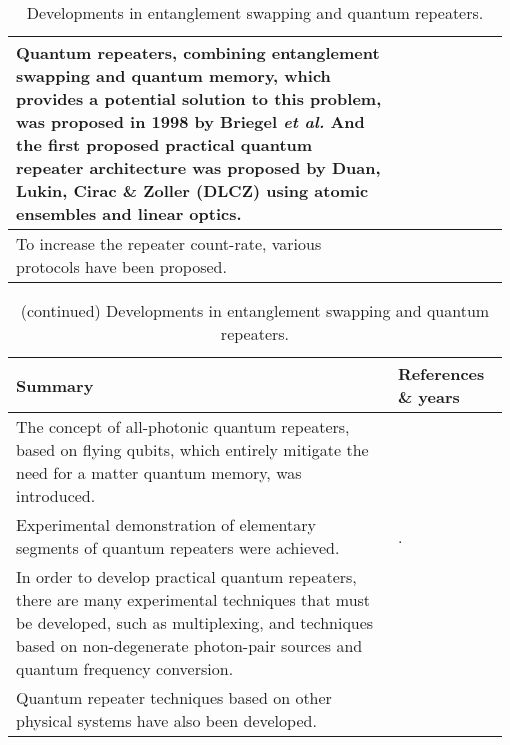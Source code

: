\begin{table*}[!htbp]
\begin{tabular}{|p{0.755\linewidth}|p{0.22\linewidth}|}
		Quantum repeaters, combining entanglement swapping and quantum memory, which provides a potential solution to this problem, was proposed in 1998 by Briegel \textit{et al.} And the first proposed practical quantum repeater architecture was proposed by Duan, Lukin, Cirac \& Zoller (DLCZ) using atomic ensembles and linear optics.&\cite{bib:BDCZ98, bib:Duan01}\\\hline
		To increase the repeater count-rate, various protocols  have been proposed.&\cite{bib:RMP_83_33, bib:PRA_79_042340, bib:PRA_92_012307, bib:PRA_81_052311, bib:PRA_81_052329, bib:NP_6_777, bib:MKLLJ14}\\\hline
	\end{tabular}
		\captionspacetab \caption{Developments in entanglement swapping and quantum repeaters.} \label{tab:entanglement_swap1}
\end{table*}

\begin{table*}[!htbp]
	\begin{tabular}{|p{0.755\linewidth}|p{0.22\linewidth}|}
		\hline
		\textbf{Summary} & \textbf{References \& years} \\
		\hline \hline
		The concept of all-photonic quantum repeaters, based on flying qubits, which entirely mitigate the need for a matter quantum memory, was introduced. &\cite{bib:azuma2015all}\\\hline
		Experimental demonstration of elementary segments of quantum repeaters were achieved.&\cite{bib:Sc_316_1316, bib:Nature_454_1098}.\\\hline
		In order to develop practical quantum repeaters, there are many experimental techniques that must be developed, such as multiplexing, and techniques based on non-degenerate photon-pair sources and quantum frequency conversion. &\cite{bib:PRA_76_050301, bib:PRA_82_010304, bib:PRL_113_053603, bib:PRL_98_060502,bib:Nat_469_508, bib:Nat_469_512, bib:PRL_112_040504, bib:PRA_92_012329,bib:NP_6_894, bib:NC_5_3376}\\\hline
		Quantum repeater techniques based on other physical systems have also been developed. &\cite{bib:NP_11_37, bib:Sc_337_72, bib:N_484_195, bib:bernien2013heralded}\\\hline
	\end{tabular}
		\captionspacetab \caption{(continued) Developments in entanglement swapping and quantum repeaters.} \label{tab:entanglement_swap2}
\end{table*}

